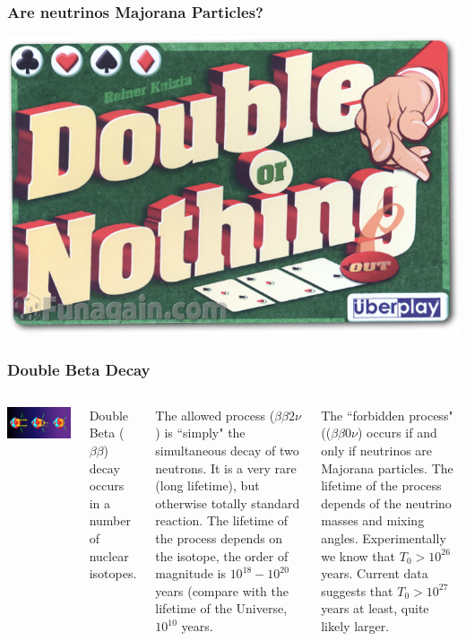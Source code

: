 \begin{frame}
\frametitle{Are neutrinos Majorana Particles?}
\includegraphics[scale=0.30]{img/DoubleOrNothing.png}
\end{frame}

\begin{frame}
\frametitle{Double Beta Decay}
\begin{columns}
\includegraphics[scale=0.2]{img/doublebeta.png}
 
Double Beta ($\beta\beta$) decay occurs in a number of nuclear isotopes. 

The allowed process ($\beta\beta 2\nu$) is ``simply" the simultaneous decay of two neutrons. It is a very rare (long lifetime), but otherwise totally standard reaction. The lifetime of the process depends on the isotope, the order of magnitude is $10^{18}-10^{20}$ years (compare with the lifetime of the Universe, $10^{10}$ years.

The ``forbidden process" (($\beta\beta 0\nu$) occurs if and only if neutrinos are Majorana particles. The lifetime of the process depends of the neutrino masses and mixing angles. Experimentally we know that $T_0 > 10^{26}$ years. Current data suggests that $T_0 > 10^{27}$ years at least, quite likely larger. 
\end{columns}
\end{frame}

